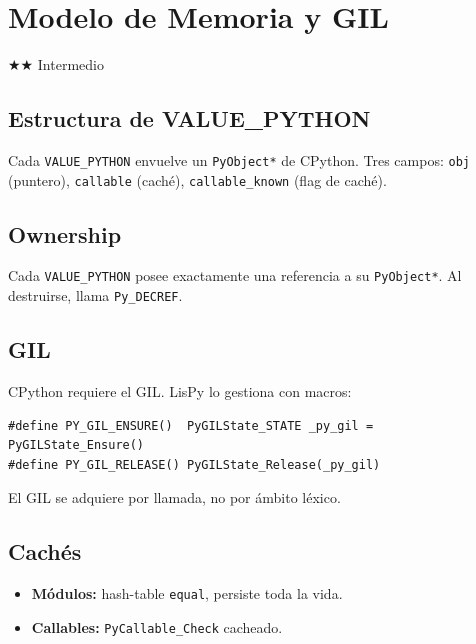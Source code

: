 \chapter{Modelo de Memoria y GIL}
\label{chap:memory}
{\huge$\bigstar$}{\huge$\bigstar$} Intermedio

\section{Estructura de VALUE\_PYTHON}

Cada \texttt{VALUE\_PYTHON} envuelve un \texttt{PyObject*} de CPython.
Tres campos: \texttt{obj} (puntero), \texttt{callable} (caché),
\texttt{callable\_known} (flag de caché).

\section{Ownership}

Cada \texttt{VALUE\_PYTHON} posee exactamente una referencia a su
\texttt{PyObject*}. Al destruirse, llama \texttt{Py\_DECREF}.

\section{GIL}

CPython requiere el GIL. LisPy lo gestiona con macros:
\begin{verbatim}
#define PY_GIL_ENSURE()  PyGILState_STATE _py_gil = PyGILState_Ensure()
#define PY_GIL_RELEASE() PyGILState_Release(_py_gil)
\end{verbatim}

El GIL se adquiere por llamada, no por ámbito léxico.

\section{Cachés}

\begin{itemize}
\item \textbf{Módulos:} hash-table \texttt{equal}, persiste toda la vida.
\item \textbf{Callables:} \texttt{PyCallable\_Check} cacheado.
\end{itemize}


